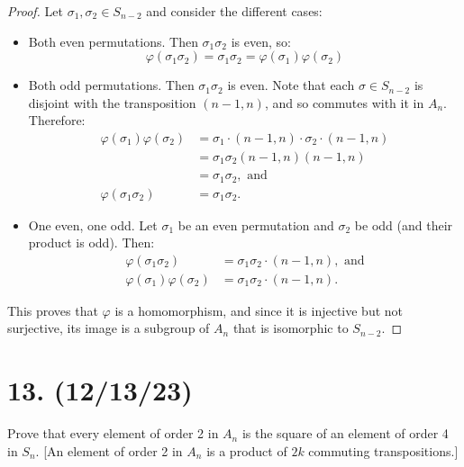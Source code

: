 \documentclass{article}
\begin{document}
\begin{proof}
    Let $\sigma_1, \sigma_2 \in S_{n - 2}$ and consider the different cases:
    \begin{itemize}[itemsep=0em]
        \item Both even permutations. Then $\sigma_1 \sigma_2$ is even, so:
              \begin{equation*}
                \varphi(\sigma_1 \sigma_2) = \sigma_1 \sigma_2 = \varphi(\sigma_1) \varphi(\sigma_2)
              \end{equation*}
        \item Both odd permutations. Then $\sigma_1 \sigma_2$ is even. Note that each $\sigma \in S_{n - 2}$ is disjoint with the transposition $(n - 1, n)$, and so commutes with it in $A_n$. Therefore:
              \begin{align*}
                  \varphi(\sigma_1) \varphi(\sigma_2) &= \sigma_1 \cdot (n - 1, n) \cdot \sigma_2 \cdot (n - 1, n) \\ &= \sigma_1 \sigma_2 (n - 1, n)(n - 1, n) \\
                  &= \sigma_1 \sigma_2, \text{ and} \\
                  \varphi(\sigma_1 \sigma_2) &= \sigma_1 \sigma_2.
              \end{align*}
        \item One even, one odd. Let $\sigma_1$ be an even permutation and $\sigma_2$ be odd (and their product is odd). Then:
              \begin{align*}
                \varphi(\sigma_1 \sigma_2) &= \sigma_1 \sigma_2 \cdot (n - 1, n), \text{ and} \\
                \varphi(\sigma_1) \varphi(\sigma_2) &= \sigma_1 \sigma_2 \cdot (n - 1, n).
              \end{align*}
    \end{itemize}
    This proves that $\varphi$ is a homomorphism, and since it is injective but not surjective, its image is a subgroup of $A_n$ that is isomorphic to $S_{n - 2}$.
\end{proof}

\section*{13. (12/13/23)}

Prove that every element of order 2 in $A_n$ is the square of an element of order 4 in $S_n$. [An element of order 2 in $A_n$ is a product of $2k$ commuting transpositions.]
\end{document}
